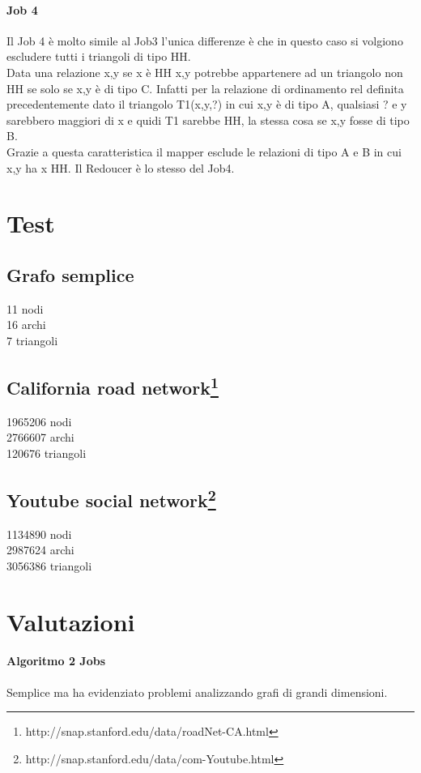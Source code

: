 \documentclass[paper=a4, fontsize=11pt]{scrartcl}	%
\numberwithin{equation}{section}															%
\numberwithin{figure}{section}																%
\numberwithin{table}{section}																%
\begin{document}
\paragraph{Job 4}
Il Job 4 è molto simile al Job3 l'unica differenze è che in questo caso si volgiono escludere tutti i triangoli di tipo HH.\\
Data una relazione x,y se x è HH x,y potrebbe appartenere ad un triangolo non HH se solo se x,y è di tipo C. Infatti per la relazione di ordinamento rel definita precedentemente dato il triangolo T1(x,y,?) in cui x,y è di tipo A, qualsiasi ? e y sarebbero maggiori di x e quidi T1 sarebbe HH, la stessa cosa se x,y fosse di tipo B.\\
Grazie a questa caratteristica il mapper esclude le relazioni di tipo A e B in cui x,y ha x HH.
Il Redoucer è lo stesso del Job4.
\section{Test}
\subsection{Grafo semplice} 
11 nodi\\
16 archi\\
7 triangoli
\subsection{California road network\protect\footnote{http://snap.stanford.edu/data/roadNet-CA.html}} 
1965206 nodi\\
2766607 archi\\
120676 triangoli
\subsection{Youtube social network\protect\footnote{http://snap.stanford.edu/data/com-Youtube.html}} 

1134890 nodi\\
2987624 archi\\
3056386 triangoli

\section{Valutazioni}
\paragraph{Algoritmo 2 Jobs}
Semplice ma ha evidenziato problemi analizzando grafi di grandi dimensioni. 
\end{document}
